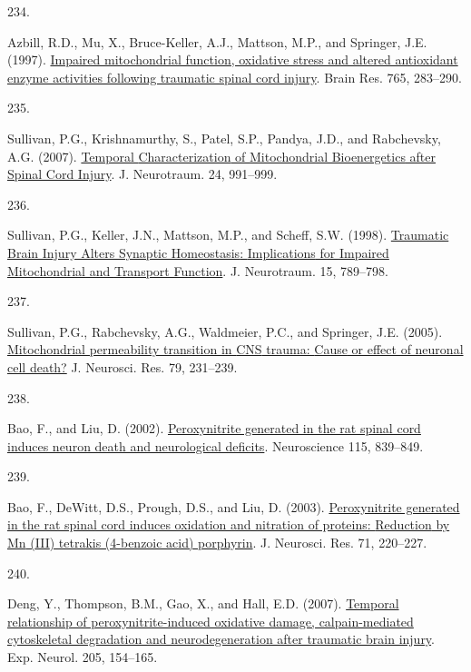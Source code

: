 \documentclass[
]{article}
\newlength{\cslhangindent}
\newlength{\csllabelwidth}
\newlength{\cslentryspacingunit} %
\newenvironment{CSLReferences}[2] %
 {%
  \setlength{\parindent}{0pt}
  \ifodd #1
  \let\oldpar\par
  \def\par{\hangindent=\cslhangindent\oldpar}
  \fi
  \setlength{\parskip}{#2\cslentryspacingunit}
 }%
 {}
\newcommand{\CSLLeftMargin}[1]{\parbox[t]{\csllabelwidth}{#1}}
\newcommand{\CSLRightInline}[1]{\parbox[t]{\linewidth - \csllabelwidth}{#1}\break}
\begin{document}
\begin{CSLReferences}{0}{0}
\leavevmode{}%
\CSLLeftMargin{234. }
\CSLRightInline{Azbill, R.D., Mu, X., Bruce-Keller, A.J., Mattson, M.P., and Springer, J.E. (1997). \href{https://doi.org/10.1016/S0006-8993(97)00573-8}{Impaired mitochondrial function, oxidative stress and altered antioxidant enzyme activities following traumatic spinal cord injury}. Brain Res. 765, 283--290.}

\leavevmode{}%
\CSLLeftMargin{235. }
\CSLRightInline{Sullivan, P.G., Krishnamurthy, S., Patel, S.P., Pandya, J.D., and Rabchevsky, A.G. (2007). \href{https://doi.org/10.1089/neu.2006.0242}{Temporal {Characterization} of {Mitochondrial Bioenergetics} after {Spinal Cord Injury}}. J. Neurotraum. 24, 991--999.}

\leavevmode{}%
\CSLLeftMargin{236. }
\CSLRightInline{Sullivan, P.G., Keller, J.N., Mattson, M.P., and Scheff, S.W. (1998). \href{https://doi.org/10.1089/neu.1998.15.789}{Traumatic {Brain Injury Alters Synaptic Homeostasis}: {Implications} for {Impaired Mitochondrial} and {Transport Function}}. J. Neurotraum. 15, 789--798.}

\leavevmode{}%
\CSLLeftMargin{237. }
\CSLRightInline{Sullivan, P.G., Rabchevsky, A.G., Waldmeier, P.C., and Springer, J.E. (2005). \href{https://doi.org/10.1002/jnr.20292}{Mitochondrial permeability transition in {CNS} trauma: {Cause} or effect of neuronal cell death?} J. Neurosci. Res. 79, 231--239.}

\leavevmode{}%
\CSLLeftMargin{238. }
\CSLRightInline{Bao, F., and Liu, D. (2002). \href{https://doi.org/10.1016/S0306-4522(02)00506-7}{Peroxynitrite generated in the rat spinal cord induces neuron death and neurological deficits}. Neuroscience 115, 839--849.}

\leavevmode{}%
\CSLLeftMargin{239. }
\CSLRightInline{Bao, F., DeWitt, D.S., Prough, D.S., and Liu, D. (2003). \href{https://doi.org/10.1002/jnr.10481}{Peroxynitrite generated in the rat spinal cord induces oxidation and nitration of proteins: {Reduction} by {Mn} ({III}) tetrakis (4-benzoic acid) porphyrin}. J. Neurosci. Res. 71, 220--227.}

\leavevmode{}%
\CSLLeftMargin{240. }
\CSLRightInline{Deng, Y., Thompson, B.M., Gao, X., and Hall, E.D. (2007). \href{https://doi.org/10.1016/j.expneurol.2007.01.023}{Temporal relationship of peroxynitrite-induced oxidative damage, calpain-mediated cytoskeletal degradation and neurodegeneration after traumatic brain injury}. Exp. Neurol. 205, 154--165.}


\end{CSLReferences}
\end{document}
